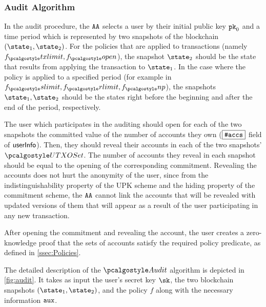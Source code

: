 \subsubsection{Audit Algorithm}

In the audit procedure, the $\AA$ selects a user by their initial public key $\inpk$ and a time period which is represented by two snapshots of the blockchain $(\snap_1, \snap_2)$. For the policies that are applied to transactions (namely $ f_\txnlimit, f_\open$), the snapshot $\snap_2$ should be the state that results from applying the transaction to $\snap_1$. In the case where the policy is applied to a specified period (for example in $f_\sendlimit, f_\receivelimit, f_\nonpart$), the snapshots $\snap_1, \snap_2$ should be the states right before the beginning and after the end of the period, respectively.

The user which participates in the auditing should open for each of the two snapshots the committed value of the number of accounts they own ($\comm{\numaccs}$ field of $\userinfo$). Then, they should reveal their accounts in each of the two snapshots' $\utxoset$. The number of accounts they reveal in each snapshot should be equal to the opening of the corresponding commitment.
Revealing the accounts does not hurt the anonymity of the user, since from the indistinguishability property of the UPK scheme and the hiding property of the commitment scheme, the $\AA$ cannot link the accounts that will be revealed with updated versions of them that will appear as a result of the user participating in any new transaction.

After opening the commitment and revealing the account, the user creates a zero-knowledge proof that the sets of accounts satisfy the required policy predicate, as defined in \autoref{ssec:Policies}.

The detailed description of the $\audit$ algorithm is depicted in \autoref{fig:audit}. It takes as input the user's secret key $\sk$, the two blockchain snapshots $(\snap_{1}, \snap_{2})$, and the policy $f$ along with the necessary information $\aux$.

